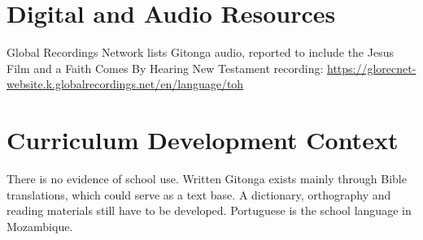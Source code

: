 \documentclass[12pt]{article}
\begin{document}
\section{Digital and Audio Resources}
Global Recordings Network lists Gitonga audio, reported to include the Jesus Film and a Faith Comes By Hearing New Testament recording: \url{https://glorecnet-website.k.globalrecordings.net/en/language/toh}

\section{Curriculum Development Context}
There is no evidence of school use. Written Gitonga exists mainly through Bible translations, which could serve as a text base. A dictionary, orthography and reading materials still have to be developed. Portuguese is the school language in Mozambique.
\end{document}
